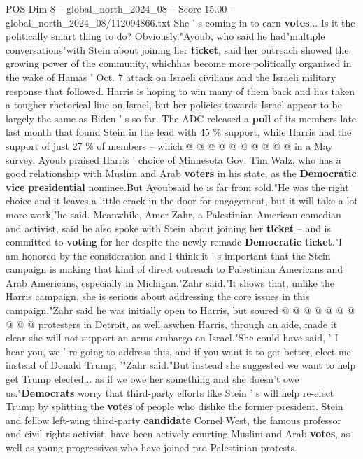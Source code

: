 \begin{textsample}{POS Dim 8 – global\_north\_2024\_08 – Score 15.00 – global\_north\_2024\_08/112094866.txt}
She ' s coming in to earn \textbf{votes}...
Is it the politically smart thing to do?
Obviously."Ayoub, who said he had"multiple conversations"with Stein about joining her \textbf{ticket}, said her outreach showed the growing power of the community, whichhas become more politically organized in the wake of Hamas ' Oct. 7 attack on Israeli civilians and the Israeli military response that followed.
Harris is hoping to win many of them back and has taken a tougher rhetorical line on Israel, but her policies towards Israel appear to be largely the same as Biden ' s so far.
The ADC released a \textbf{poll} of its members late last month that found Stein in the lead with 45 \% support, while Harris had the support of just 27 \% of members -- which @ @ @ @ @ @ @ @ @ @ in a May survey.
Ayoub praised Harris ' choice of Minnesota Gov.
Tim Walz, who has a good relationship with Muslim and Arab \textbf{voters} in his state, as the \textbf{Democratic} \textbf{vice} \textbf{presidential} nominee.But Ayoubsaid he is far from sold."He was the right choice and it leaves a little crack in the door for engagement, but it will take a lot more work,"he said.
Meanwhile, Amer Zahr, a Palestinian American comedian and activist, said he also spoke with Stein about joining her \textbf{ticket} -- and is committed to \textbf{voting} for her despite the newly remade \textbf{Democratic} \textbf{ticket}."I am honored by the consideration and I think it ' s important that the Stein campaign is making that kind of direct outreach to Palestinian Americans and Arab Americans, especially in Michigan,"Zahr said."It shows that, unlike the Harris campaign, she is serious about addressing the core issues in this campaign."Zahr said he was initially open to Harris, but soured @ @ @ @ @ @ @ @ @ @ protesters in Detroit, as well aswhen Harris, through an aide, made it clear she will not support an arms embargo on Israel."She could have said, ' I hear you, we ' re going to address this, and if you want it to get better, elect me instead of Donald Trump, '"Zahr said."But instead she suggested we want to help get Trump elected... as if we owe her something and she doesn't owe us."\textbf{Democrats} worry that third-party efforts like Stein ' s will help re-elect Trump by splitting the \textbf{votes} of people who dislike the former president.
Stein and fellow left-wing third-party \textbf{candidate} Cornel West, the famous professor and civil rights activist, have been actively courting Muslim and Arab \textbf{votes}, as well as young progressives who have joined pro-Palestinian protests.

\end{textsample}
